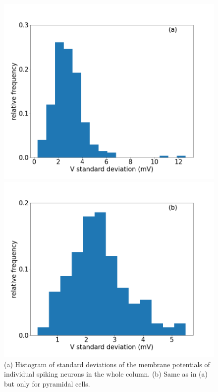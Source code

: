\begin{figure}[H]
    \centering
    \begin{minipage}[b]{0.45\textwidth}
    \includegraphics[scale=0.23]{Figures/Fig5a.png}
    \end{minipage}
    \hfill
    \begin{minipage}[b]{0.5\textwidth}
        \includegraphics[scale=0.23]{Figures/Fig5b.png}
    \end{minipage}
    \caption{(a) Histogram of standard deviations of the membrane potentials of individual spiking neurons in the whole column. (b) Same as in (a) but only for pyramidal cells.}
    \label{fig:fig5}
\end{figure}

